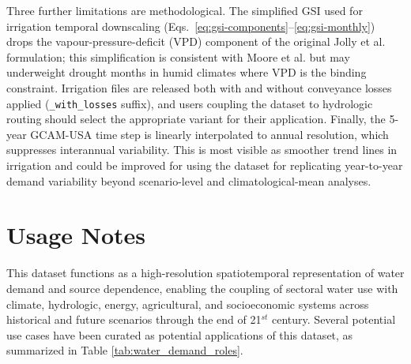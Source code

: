 \documentclass[fleqn,10pt]{wlscirep}
\begin{document}
Three further limitations are methodological. The simplified GSI used for irrigation temporal downscaling (Eqs.~\ref{eq:gsi-components}--\ref{eq:gsi-monthly}) drops the vapour-pressure-deficit (VPD) component of the original Jolly et al.\cite{Jolly_2005} formulation; this simplification is consistent with Moore et al.\cite{Moore_2015} but may underweight drought months in humid climates where VPD is the binding constraint. Irrigation files are released both with and without conveyance losses applied (\texttt{\_with\_losses} suffix), and users coupling the dataset to hydrologic routing should select the appropriate variant for their application. Finally, the 5-year GCAM-USA time step is linearly interpolated to annual resolution, which suppresses interannual variability. This is most visible as smoother trend lines in irrigation and could be improved for using the dataset for replicating year-to-year demand variability beyond scenario-level and climatological-mean analyses.

\section*{Usage Notes}

This dataset functions as a high-resolution spatiotemporal representation of water demand and source dependence, enabling the coupling of sectoral water use with climate, hydrologic, energy, agricultural, and socioeconomic systems across historical and future scenarios through the end of 21$^{st}$ century. Several potential use cases have been curated as potential applications of this dataset, as summarized in Table \ref{tab:water_demand_roles}.
\end{document}
